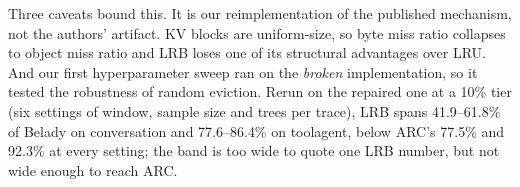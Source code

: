 Three caveats bound this. It is our reimplementation of the published mechanism, not the authors'
artifact. KV blocks are uniform-size, so byte miss ratio collapses to object miss ratio and LRB loses one
of its structural advantages over LRU. And our first hyperparameter sweep ran on the \emph{broken}
implementation, so it tested the robustness of random eviction. Rerun on the repaired one at a 10\%
tier (six settings of window, sample size and trees per trace), LRB spans 41.9--61.8\% of Belady on
conversation and 77.6--86.4\% on toolagent, below ARC's 77.5\% and 92.3\% at every setting; the band
is too wide to quote one LRB number, but not wide enough to reach ARC.

